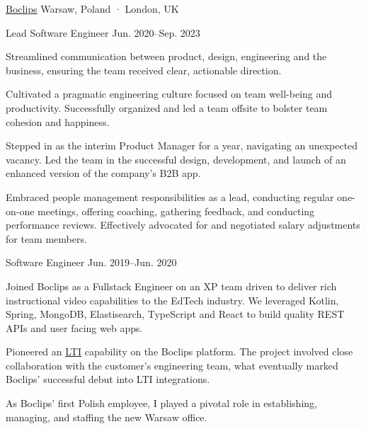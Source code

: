 \begin{cventries}
  \multicventry
    {\href{https://www.boclips.com}{Boclips}} %
    {Warsaw, Poland · London, UK} %
    {
      \multicventryitem
        {Lead Software Engineer} %
        {Jun. 2020–Sep. 2023} %
        {
          \begin{cvitems} %
            \item {Streamlined communication between product, design, engineering and the business, ensuring the team received clear, actionable direction.}
            \item {Cultivated a pragmatic engineering culture focused on team well-being and productivity. Successfully organized and led a team offsite to bolster team cohesion and happiness.}
            \item {Stepped in as the interim Product Manager for a year, navigating an unexpected vacancy. Led the team in the successful design, development, and launch of an enhanced version of the company’s B2B app.}
            \item {Embraced people management responsibilities as a lead, conducting regular one-on-one meetings, offering coaching, gathering feedback, and conducting performance reviews. Effectively advocated for and negotiated salary adjustments for team members.}
          \end{cvitems}
        }
      \multicventryitem
        {Software Engineer} %
        {Jun. 2019–Jun. 2020} %
        {
          \begin{cvitems} %
            \item {Joined Boclips as a Fullstack Engineer on an XP team driven to deliver rich instructional video capabilities to the EdTech industry. We leveraged Kotlin, Spring, MongoDB, Elastisearch, TypeScript and React to build quality REST APIs and user facing web apps.}
            \item {Pioneered an \href{https://www.1edtech.org/standards/lti}{\underline{LTI}} capability on the Boclips platform. The project involved close collaboration with the customer's engineering team, what eventually marked Boclips' successful debut into LTI integrations.}
            \item {As Boclips' first Polish employee, I played a pivotal role in establishing, managing, and staffing the new Warsaw office.}
          \end{cvitems}
        }
    }


\end{cventries}

